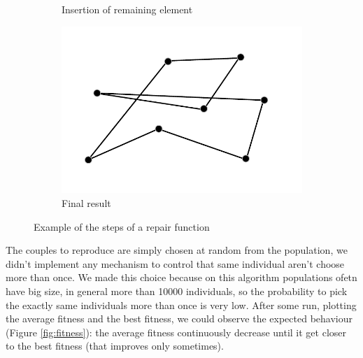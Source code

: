 \begin{figure}[h!]
\begin{subfigure}[b]{0.49\linewidth}
    \caption{Insertion of remaining element}
  \end{subfigure}
  \begin{subfigure}[b]{0.49\linewidth}
    \includegraphics[width=\linewidth]{media/gene4.pdf}
    \caption{Final result}
  \end{subfigure}
  \caption{Example of the steps of a repair function}
  \label{fig:genetic}
\end{figure}

\noindent The couples to reproduce are simply chosen at random from the population, we didn't implement any mechanism to control that same individual aren't choose more than once. We made this choice because on this algorithm populations ofetn have big size, in general more than 10000 individuals, so the probability to pick the exactly same individuals more than once is very low.
After some run, plotting the average fitness and the best fitness, we could observe the 
expected behaviour (Figure \ref{fig:fitness}): the average fitness continuously decrease until it get closer to the best fitness (that improves only sometimes).  \\

